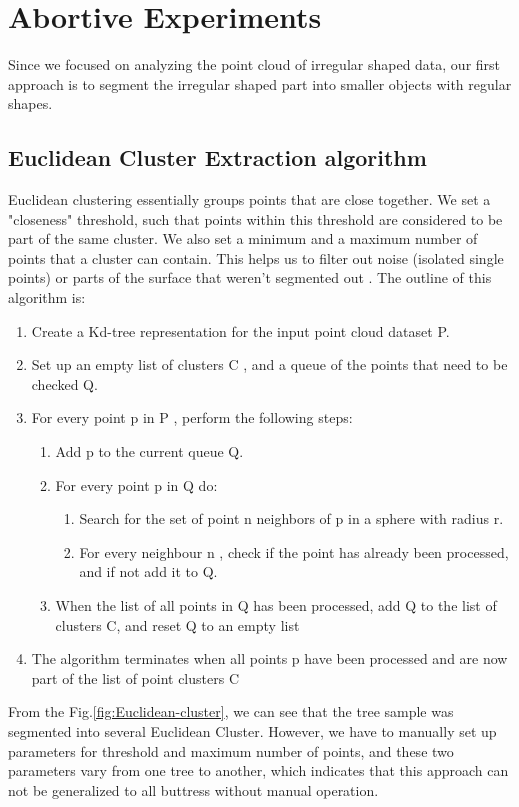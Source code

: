 \documentclass[runningheads,a4paper]{llncs}
\begin{document}
\section{Abortive Experiments}
Since we focused on analyzing the point cloud of irregular shaped data, our first approach is to segment the irregular shaped part into smaller objects with regular shapes. 
\subsection{Euclidean Cluster Extraction algorithm}
Euclidean clustering essentially groups points that are close together. We set a "closeness" threshold, such that points within this threshold are considered to be part of the same cluster. We also set a minimum and a maximum number of points that a cluster can contain. This helps us to filter out noise (isolated single points) or parts of the surface that weren't segmented out \cite{9}. The outline of this algorithm is:
\begin{enumerate}
\item Create a Kd-tree representation for the input point cloud dataset P.
\item Set up an empty list of clusters C , and a queue of the points that need to be checked Q.
\item For every point p in P , perform the following steps:
\begin{enumerate}
\item Add p to the current queue Q.
\item	For every point p in Q do:
\begin{enumerate}
\item Search for the set of point n neighbors of p in a sphere with radius r.
\item For every neighbour n , check if the point has already been processed, and if not add it to Q.
\end{enumerate}
\item When the list of all points in Q has been processed, add Q to the list of clusters C, and reset Q to an empty list
\end{enumerate}
\item The algorithm terminates when all points p have been processed and are now part of the list of point clusters C
\end{enumerate}

From the Fig.\ref{fig:Euclidean-cluster}, we can see that the tree sample was segmented into several Euclidean Cluster. However, we have to manually set up parameters for threshold and maximum number of points, and these two parameters vary from one tree to another, which indicates that this approach can not be generalized to all buttress without manual operation. 
\end{document}
